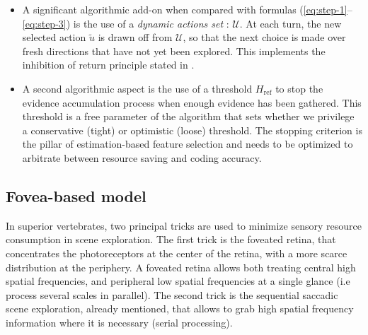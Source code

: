 \documentclass{article} %
\begin{document}
\begin{itemize}
	\item A significant algorithmic add-on when compared with formulas (\ref{eq:step-1}--\ref{eq:step-3}) is the use of a \emph{dynamic actions set} : $\mathcal{U}$. At each turn, the new selected action $\tilde{u}$ is drawn off from $\mathcal{U}$, so that the next choice is made over fresh directions that have not yet been explored. This implements the inhibition of return principle stated in \cite{itti2001computational}.
	\item A second algorithmic aspect is the use of a threshold $H_\text{ref}$ to stop the evidence accumulation process when enough evidence has been gathered. This threshold is a free parameter of the algorithm that sets whether we privilege a conservative (tight) or optimistic (loose) threshold. The stopping criterion is the pillar of estimation-based feature selection and needs to be optimized to arbitrate between resource saving and coding accuracy. 
\end{itemize}




\subsection{Fovea-based model}

In superior vertebrates, two principal tricks are used to minimize sensory resource consumption in scene exploration. The first trick is the foveated retina, that concentrates the photoreceptors at the center of the retina, with a more scarce distribution at the periphery. A foveated retina allows both treating central high spatial frequencies, and peripheral low spatial frequencies at a single glance (i.e process several scales in parallel). The second trick is the sequential saccadic scene exploration, already mentioned, that allows to grab high spatial frequency information where it is necessary (serial processing). 
\end{document}
